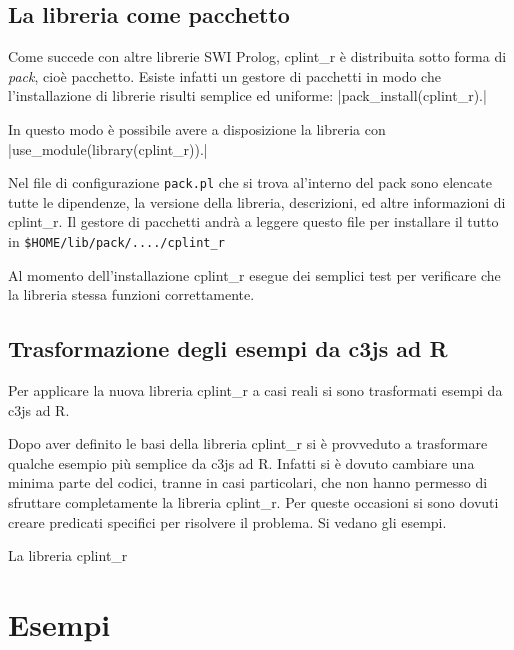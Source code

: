 \documentclass[10pt,titlepage,twoside,a4paper]{report}
\newenvironment{code}{\singlespacing\captionsetup{type=listing}}{}
\begin{document}

\section{La libreria come pacchetto}
Come succede con altre librerie SWI Prolog, cplint\_r è distribuita sotto 
forma di \emph{pack}, cioè pacchetto. Esiste infatti un gestore di pacchetti 
in modo che l'installazione di librerie risulti semplice ed uniforme: 
|pack_install(cplint_r).|

In questo modo è possibile avere a disposizione la libreria con 
|use_module(library(cplint_r)).|

Nel file di configurazione \texttt{pack.pl} che si trova al'interno del pack 
sono elencate tutte le dipendenze, la versione della libreria, descrizioni, 
ed altre informazioni di cplint\_r. Il gestore di pacchetti andrà a leggere 
questo file per installare il tutto in \texttt{\$HOME/lib/pack/..../cplint\_r}

Al momento dell'installazione cplint\_r esegue dei semplici 
test per verificare che la libreria stessa funzioni correttamente.


\section{Trasformazione degli esempi da c3js ad R} \label{sec:trasformazione-
degli-esempi-da-c3js-ad-r}
Per applicare la nuova libreria cplint\_r a casi reali si sono trasformati 
esempi da c3js ad R.

Dopo aver definito le basi della libreria cplint\_r si è provveduto a 
trasformare qualche esempio più semplice da c3js ad R. Infatti si è 
dovuto cambiare una minima parte del codici, tranne in casi particolari, che 
non hanno permesso di sfruttare completamente la 
libreria cplint\_r. Per queste occasioni si sono dovuti creare predicati 
specifici per risolvere il problema. Si vedano gli esempi.

\begin{code}
    \caption{La libreria cplint\_r}
\end{code}




\chapter{Esempi}
\end{document}
